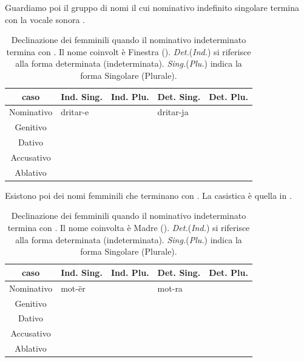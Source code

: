 Guardiamo poi il gruppo di nomi il cui nominativo indefinito singolare termina con la vocale sonora .

\begin{table}[H]
    \centering
    \begin{tabular}{cllll}
        \toprule
        caso        & Ind. Sing.    & Ind. Plu. & Det. Sing.    & Det. Plu. \\
        \midrule
        Nominativo  & dritar-e          &       & dritar-ja               &  \\
        Genitivo    & & & & \\
        Dativo      & & & & \\
        Accusativo  & & & & \\
        Ablativo    & & & & \\
        \bottomrule
    \end{tabular}
    \caption{Declinazione dei femminili quando il nominativo indeterminato termina con . Il nome coinvolt è Finestra (). \textit{Det.}(\textit{Ind.}) si riferisce alla forma determinata (indeterminata). \textit{Sing.}(\textit{Plu.}) indica la forma Singolare (Plurale).}
    \label{tbl:terminaconi}
\end{table}

Esistono poi dei nomi femminili che terminano con . La casistica è quella in .

\begin{table}[H]
    \centering
    \begin{tabular}{cllll}
        \toprule
        caso        & Ind. Sing.    & Ind. Plu. & Det. Sing.    & Det. Plu. \\
        \midrule
        Nominativo  & mot-ër        &       & mot-ra               &  \\
        Genitivo    & & & & \\
        Dativo      & & & & \\
        Accusativo  & & & & \\
        Ablativo    & & & & \\
        \bottomrule
    \end{tabular}
    \caption{Declinazione dei femminili quando il nominativo indeterminato termina con . Il nome coinvolta è Madre (). \textit{Det.}(\textit{Ind.}) si riferisce alla forma determinata (indeterminata). \textit{Sing.}(\textit{Plu.}) indica la forma Singolare (Plurale).}
    \label{tbl:terminaconer}
\end{table}

